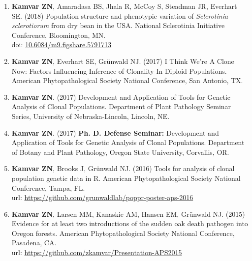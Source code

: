 \begin{enumerate}[leftmargin = 14pt]
  \vspace{3pt}
    
	\item \textbf{Kamvar ZN}, Amaradasa BS, Jhala R, McCoy S, Steadman JR,
	Everhart SE. (2018) Population structure and phenotypic variation of
	\textit{Sclerotinia sclerotiorum} from dry bean in the USA. National Sclerotinia Initiative Conference, Bloomington, MN.\\
	doi: \href{https://doi.org/10.6084/m9.figshare.5791713}{10.6084/m9.figshare.5791713}

	\vspace{3pt}

	\item \textbf{Kamvar ZN}, Everhart SE, Gr\"unwald NJ. (2017) I Think We're
	A Clone Now: Factors Influencing Inference of Clonality In Diploid
	Populations. American Phytopathological Society National Conference,
	San Antonio, TX.

	\vspace{3pt}

	\item \textbf{Kamvar ZN}. (2017) Development and Application of Tools
	for Genetic Analysis of Clonal Populations. Department of Plant Pathology
	Seminar Series, University of Nebraska-Lincoln, Lincoln, NE.

	\vspace{3pt}

	\item \textbf{Kamvar ZN}. (2017) \textbf{Ph. D. Defense Seminar:} Development and
	Application of Tools for Genetic Analysis of Clonal Populations. Department
	of Botany and Plant Pathology, Oregon State University, Corvallis, OR.

	\vspace{3pt}

	\item \textbf{Kamvar ZN}, Brooks J, Gr\"unwald NJ. (2016) Tools for analysis
	of clonal population genetic data in R. American Phytopathological Society
	National Conference, Tampa, FL.\\
	url: \href{https://github.com/grunwaldlab/poppr-poster-aps-2016#readme}{https://github.com/grunwaldlab/poppr-poster-aps-2016}

	\vspace{3pt}

	\item \textbf{Kamvar ZN}, Larsen MM, Kanaskie AM, Hansen EM, Gr\"unwald NJ.
	(2015) Evidence for at least two introductions of the sudden oak death
	pathogen into Oregon forests. American Phytopathological Society National
	Conference, Pasadena, CA. \\
	url: \href{https://github.com/zkamvar/Presentation-APS2015#readme}{https://github.com/zkamvar/Presentation-APS2015}


\end{enumerate}
